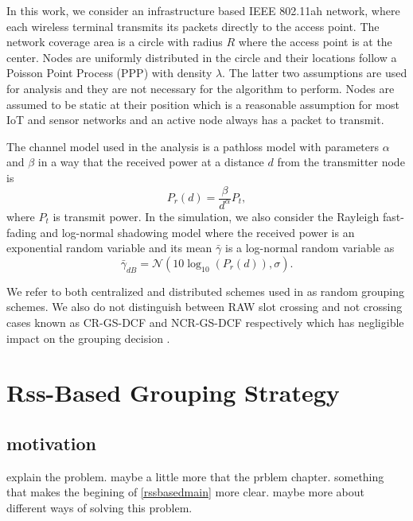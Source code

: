 In this work, we consider an infrastructure based IEEE 802.11ah network, where each wireless terminal transmits its packets directly to the access point. %
The network coverage area is a circle with radius $R$ where the access point is at the center. Nodes are uniformly distributed in the circle and their locations follow a Poisson Point Process (PPP) with density $\lambda$. The latter two assumptions are used for analysis and they are not necessary for the algorithm to perform. Nodes are assumed to be static at their position which is a reasonable assumption for most IoT and sensor networks and an active node always has a packet to transmit. %

The channel model used in the analysis is a pathloss model with parameters $\alpha$ and $\beta$ in a way that the received power at a distance $d$ from the transmitter node is
\begin{equation}
P_r(d)=\frac{\beta}{d^\alpha} P_t,
\end{equation}
where $P_t$ is transmit power. In the simulation, we also consider the Rayleigh fast-fading and log-normal shadowing model where the received power is an exponential random variable and its mean $\bar{\gamma}$ is a log-normal random variable as 
\begin{equation}
\bar{\gamma}_{dB}= \mathcal{N}(10\log_{10}(P_r(d)),\sigma).
\end{equation}

We refer to both centralized and distributed schemes used in \cite{zheng2014performance} as random grouping schemes. We also do not distinguish between RAW slot crossing and not crossing cases known as CR-GS-DCF and NCR-GS-DCF respectively which has negligible impact on the grouping decision \cite{Draft80211ah}. 


\section{Rss-Based Grouping Strategy}

\subsection{motivation}
explain the problem. maybe a little more that the prblem chapter. something that makes the begining of \ref{rssbasedmain} more clear. maybe more about different ways of solving this problem.


